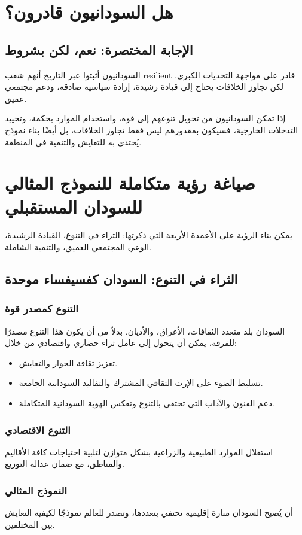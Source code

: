 \documentclass[12pt]{article}
\begin{document}
\section{هل السودانيون قادرون؟}
\subsection{الإجابة المختصرة: نعم، لكن بشروط}
السودانيون أثبتوا عبر التاريخ أنهم شعب resilient قادر على مواجهة التحديات الكبرى. لكن تجاوز الخلافات يحتاج إلى قيادة رشيدة، إرادة سياسية صادقة، ودعم مجتمعي عميق.

إذا تمكن السودانيون من تحويل تنوعهم إلى قوة، واستخدام الموارد بحكمة، وتحييد التدخلات الخارجية، فسيكون بمقدورهم ليس فقط تجاوز الخلافات، بل أيضًا بناء نموذج يُحتذى به للتعايش والتنمية في المنطقة.

\section{صياغة رؤية متكاملة للنموذج المثالي للسودان المستقبلي}
يمكن بناء الرؤية على الأعمدة الأربعة التي ذكرتها: الثراء في التنوع، القيادة الرشيدة، الوعي المجتمعي العميق، والتنمية الشاملة.

\subsection{الثراء في التنوع: السودان كفسيفساء موحدة}
\subsubsection{التنوع كمصدر قوة}
السودان بلد متعدد الثقافات، الأعراق، والأديان. بدلاً من أن يكون هذا التنوع مصدرًا للفرقة، يمكن أن يتحول إلى عامل ثراء حضاري واقتصادي من خلال:
\begin{itemize}
    \item تعزيز ثقافة الحوار والتعايش.
    \item تسليط الضوء على الإرث الثقافي المشترك والتقاليد السودانية الجامعة.
    \item دعم الفنون والآداب التي تحتفي بالتنوع وتعكس الهوية السودانية المتكاملة.
\end{itemize}

\subsubsection{التنوع الاقتصادي}
استغلال الموارد الطبيعية والزراعية بشكل متوازن لتلبية احتياجات كافة الأقاليم والمناطق، مع ضمان عدالة التوزيع.

\subsubsection{النموذج المثالي}
أن يُصبح السودان منارة إقليمية تحتفي بتعددها، وتصدر للعالم نموذجًا لكيفية التعايش بين المختلفين.
\end{document}
